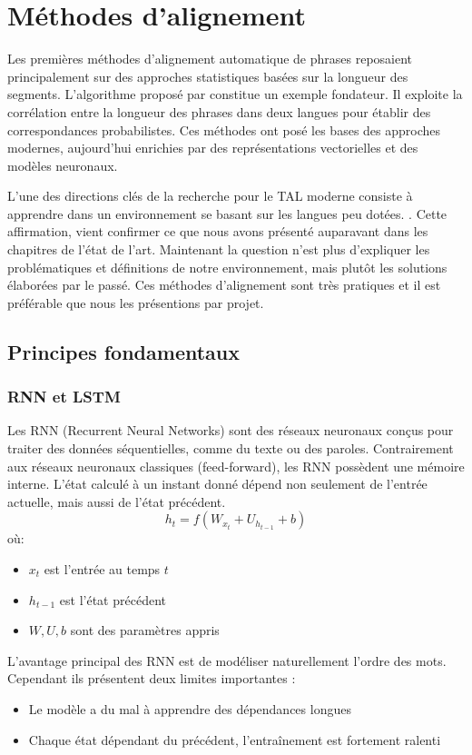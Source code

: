 \chapter{Méthodes d’alignement}

Les premières méthodes d’alignement automatique de phrases reposaient principalement sur
des approches statistiques basées sur la longueur des segments. L’algorithme proposé par
\citet{gale_1991} constitue un exemple fondateur. Il exploite la corrélation entre la
longueur des phrases dans deux langues pour établir des correspondances probabilistes.
Ces méthodes ont posé les bases des approches modernes, aujourd’hui enrichies par des
représentations vectorielles et des modèles neuronaux.

L'une des directions clés de la recherche pour le TAL moderne consiste à apprendre dans un environnement se basant sur les langues peu dotées.
\citep{hedderich_2021, artemova_2023}. Cette affirmation, vient confirmer ce que nous avons présenté
auparavant dans les chapitres de l'état de l'art. Maintenant la question n'est plus d'expliquer les
problématiques et définitions de notre environnement, mais plutôt les solutions élaborées par le passé.
Ces méthodes d'alignement sont très pratiques et il est préférable que nous les présentions par projet.

\section{Principes fondamentaux}

\subsection{RNN et LSTM}

Les RNN (Recurrent Neural Networks) sont des réseaux neuronaux conçus pour traiter des
données séquentielles, comme du texte ou des paroles.
Contrairement aux réseaux neuronaux classiques (feed-forward), les RNN possèdent une mémoire interne.
L’état calculé à un instant donné dépend non seulement de l’entrée actuelle, mais aussi de l’état précédent.
\[ h_{t}=f(W_{x_{t}}+U_{h_{t-1}}+b) \]
où:
\begin{itemize}
    \item \( x_{t} \) est l'entrée au temps \( t \)
    \item \( h_{t-1} \) est l'état précédent
    \item \( W, U, b \) sont des paramètres appris
\end{itemize}
L'avantage principal des RNN est de modéliser naturellement l’ordre des mots.
Cependant ils présentent deux limites importantes{ :}
\begin{itemize}
    \item Le modèle a du mal à apprendre des dépendances longues
    \item Chaque état dépendant du précédent, l'entraînement est fortement ralenti
\end{itemize}

